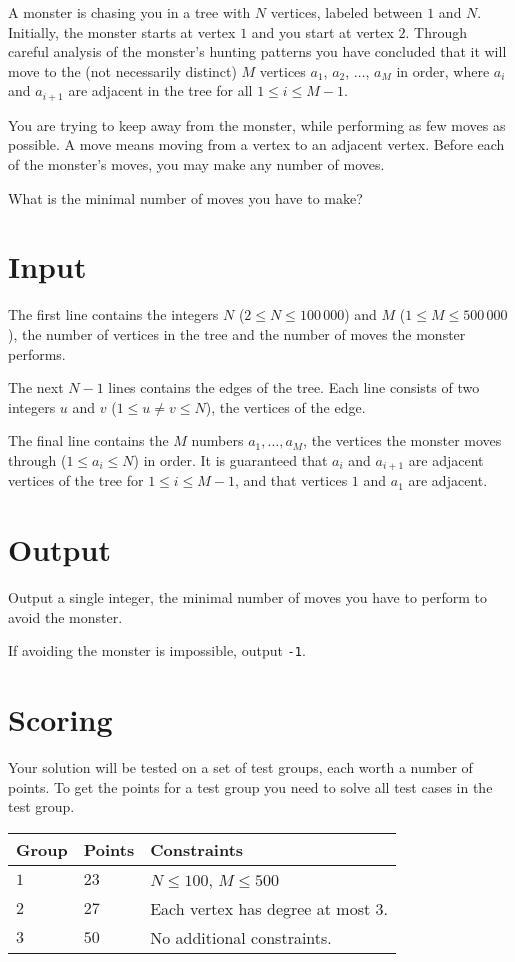 A monster is chasing you in a tree with $N$ vertices, labeled between $1$ and $N$.
Initially, the monster starts at vertex $1$ and you start at vertex $2$.
Through careful analysis of the monster's hunting patterns you have concluded that it will move to the (not necessarily distinct) $M$ vertices $a_1$, $a_2$, $\dots$, $a_M$ in order, where $a_i$ and $a_{i+1}$ are adjacent in the tree for all $1 \le i \le M - 1$.

You are trying to keep away from the monster, while performing as few moves as possible.
A move means moving from a vertex to an adjacent vertex.
Before each of the monster's moves, you may make any number of moves.

What is the minimal number of moves you have to make?

\section*{Input}
The first line contains the integers $N$ ($2 \le N \le 100\,000$) and $M$ ($1 \le M \le 500\,000$), the number of vertices in the tree and the number of moves the monster performs.

The next $N-1$ lines contains the edges of the tree.
Each line consists of two integers $u$ and $v$ ($1 \le u \neq v \le N$), the vertices of the edge.

The final line contains the $M$ numbers $a_1, \dots, a_M$, the vertices the monster moves through ($1 \le a_i \le N$) in order.
It is guaranteed that $a_i$ and $a_{i+1}$ are adjacent vertices of the tree for $1 \le i \le M-1$, and that vertices $1$ and $a_1$ are adjacent.

\section*{Output}
Output a single integer, the minimal number of moves you have to perform to avoid the monster.

If avoiding the monster is impossible, output \texttt{-1}.

\section*{Scoring}
Your solution will be tested on a set of test groups, each worth a number of points.
To get the points for a test group you need to solve all test cases in the test group.

\noindent
\begin{tabular}{| l | l | p{10cm} |}
  \hline
  Group & Points & Constraints \\ \hline
  $1$   & $23$   & $N \le 100$, $M \le 500$ \\ \hline
  $2$   & $27$   & Each vertex has degree at most $3$. \\ \hline
  $3$   & $50$   & No additional constraints. \\ \hline
\end{tabular}
